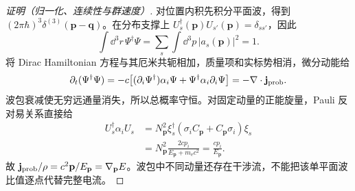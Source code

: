 \begin{proof}[证明（归一化、连续性与群速度）]
对位置内积先积分平面波，得到 $(2\pi\hbar)^3\delta^{(3)}(\mathbf p-\mathbf q)$。在分布支撑上 $U_s^\dagger(\mathbf p)U_{s'}(\mathbf p)=\delta_{ss'}$，因此
\begin{equation*}
 \int\dd^3r\,\Psi^\dagger\Psi
 =\sum_s\int\dd^3p\,|a_s(\mathbf p)|^2=1.
\end{equation*}
将 Dirac Hamiltonian 方程与其厄米共轭相加，质量项和实标势相消，微分动能给
\begin{equation*}
 \partial_t(\Psi^\dagger\Psi)
 =-c\big[(\partial_i\Psi^\dagger)\alpha_i\Psi
 +\Psi^\dagger\alpha_i\partial_i\Psi\big]
 =-\nabla\cdot\mathbf j_{\rm prob}.
\end{equation*}
波包衰减使无穷远通量消失，所以总概率守恒。对固定动量的正能旋量，Pauli 反对易关系直接给
\begin{align*}
 U_s^\dagger\alpha_iU_s
 &=N_{\mathbf p}^2\xi_s^\dagger(\sigma_iC_{\mathbf p}+C_{\mathbf p}\sigma_i)\xi_s\\
 &=N_{\mathbf p}^2\frac{2cp_i}{E_{\mathbf p}+m_{\mathrm e}c^2}
 =\frac{cp_i}{E_{\mathbf p}}.
\end{align*}
故 $\mathbf j_{\rm prob}/\rho=c^2\mathbf p/E_{\mathbf p}=\nabla_{\mathbf p}E$。波包中不同动量还存在干涉流，不能把该单平面波比值逐点代替完整电流。
\end{proof}
